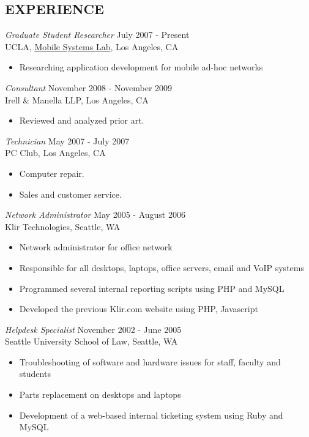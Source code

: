 \documentclass[margin]{res}
\begin{document}
\begin{resume}
\section{EXPERIENCE}

		{\sl Graduate Student Researcher} \hfill July 2007 - Present \\
                UCLA, \href{http://msl.cs.ucla.edu}{Mobile Systems Lab}, Los Angeles, CA
                 \begin{itemize}  \itemsep -2pt %
                \item Researching application development for mobile ad-hoc networks
                \end{itemize}

		{\sl Consultant} \hfill November 2008 - November 2009 \\
		Irell \& Manella LLP, Los Angeles, CA
                 \begin{itemize}  \itemsep -2pt %
                \item Reviewed and analyzed prior art.
                \end{itemize}

		{\sl Technician} \hfill May 2007 - July 2007 \\
		PC Club, Los Angeles, CA
                 \begin{itemize}  \itemsep -2pt %
                \item Computer repair.
                \item Sales and customer service.
                \end{itemize}

		{\sl Network Administrator} \hfill May 2005 - August 2006 \\
                Klir Technologies, Seattle, WA 
                 \begin{itemize}  \itemsep -2pt %
                \item Network administrator for office network
		\item Responsible for all desktops, laptops, office servers, email and VoIP systems
		\item Programmed several internal reporting scripts using PHP and MySQL
		\item Developed the previous Klir.com website using PHP, Javascript
                \end{itemize}

		{\sl Helpdesk Specialist} \hfill November 2002 - June 2005 \\
                Seattle University School of Law, Seattle, WA 
                 \begin{itemize}  \itemsep -2pt %
                \item Troubleshooting of software and hardware issues for staff, faculty and students
		\item Parts replacement on desktops and laptops
		\item Development of a web-based internal ticketing system using Ruby and MySQL
                \end{itemize}


\end{resume}
\end{document}
